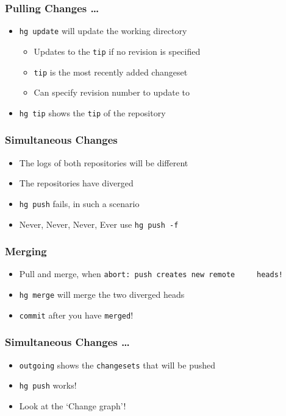 \documentclass[12pt,compress]{beamer}
\newcommand{\typ}[1]{\lstinline{#1}}
\begin{document}
\begin{frame}
  \frametitle{Pulling Changes \ldots}
  \begin{itemize}
  \item \typ{hg update} will update the working directory 
    \begin{itemize}
    \item Updates to the \typ{tip} if no revision is specified
    \item \typ{tip} is the most recently added changeset 
    \item Can specify revision number to update to
    \end{itemize}
  \item \typ{hg tip} shows the \typ{tip} of the repository
  \end{itemize}
\end{frame}

\begin{frame}
  \frametitle{Simultaneous Changes}
  \begin{itemize}
  \item The logs of both repositories will be different
  \item The repositories have diverged
  \item \typ{hg push} fails, in such a scenario
  \item \alert{Never, Never, Never, Ever} use \typ{hg push -f}
  \end{itemize}
\end{frame}

\begin{frame}
  \frametitle{Merging}
  \begin{itemize}
  \item Pull and merge, when \typ{abort: push creates new remote
    heads!}
  \item \typ{hg merge} will merge the two diverged heads
  \item \typ{commit} after you have \typ{merged}!
  \end{itemize}
\end{frame}

\begin{frame}
  \frametitle{Simultaneous Changes \ldots}
  \begin{itemize}
  \item \typ{outgoing} shows the \typ{changesets} that will be pushed
  \item \typ{hg push} works!
  \item Look at the `Change graph'!
  \end{itemize}
\end{frame}
\end{document}
